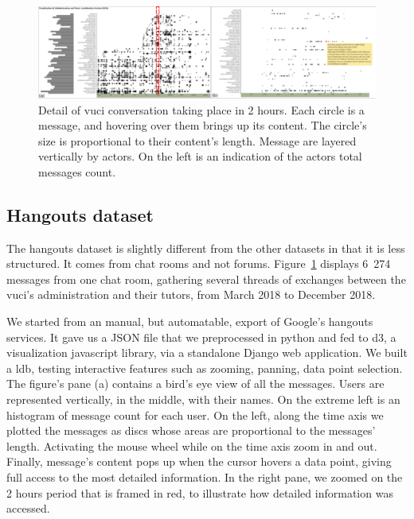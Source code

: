 \documentclass[a4paper,twoside]{article}
\begin{document}
\begin{figure}[t]
  \centering
  \includegraphics[width=\textwidth]{images/uvci_paysage_flou}
  \small{
    \caption{\label{fig:hgconv}
      Detail of \gls{vuci} conversation taking place in 2 hours.  Each circle is a message, and hovering over them brings up its content.  The circle's size is proportional to their content's length.  Message are layered vertically by actors.  On the left is an indication of the actors total messages count.
    }}
\end{figure}

\subsection{Hangouts dataset}

The hangouts dataset is slightly different from the other datasets in that it is less structured.  It comes from chat rooms and not forums.  Figure~\ref{fig:hgconv} displays 6~274 messages from one chat room, gathering several threads of exchanges between the \gls{vuci}'s administration and their tutors, from March 2018 to December 2018.

We started from an manual, but automatable, export of Google's hangouts services.  It gave us a JSON file that we preprocessed in python and fed to d3, a visualization javascript library, via a standalone Django web application.  We built a \gls{ldb}, testing interactive features such as zooming, panning, data point selection.
The figure's pane (a) contains a bird's eye view of all the messages.  Users are represented vertically, in the middle,  with their names.  On the extreme left is an histogram of message count for each user. On the left, along the time axis we plotted the messages as discs whose areas are proportional to the messages' length. Activating the mouse wheel while on the time axis zoom in and out.  Finally, message's content pops up when the cursor hovers a data point, giving full access to the most detailed information.  In the right pane, we zoomed on the 2 hours period that is framed in red, to illustrate how detailed information was accessed.
\end{document}
